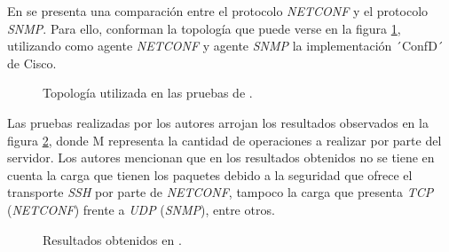 En \parencite{netconfvssnmp} se presenta una comparación entre el protocolo \textit{NETCONF} y el protocolo \textit{SNMP}. Para ello, conforman la topología que puede verse en la figura \ref{fig:netconfvssnmp1}, utilizando como agente \textit{NETCONF} y agente \textit{SNMP} la implementación ´ConfD´ de Cisco.

\begin{figure}[H]
	\centering 
	\caption[Topología utilizada en las pruebas de.]{Topología utilizada en las pruebas de \parencite{netconfvssnmp}.}
	\label{fig:netconfvssnmp1}
\end{figure}

Las pruebas realizadas por los autores arrojan los resultados observados en la figura \ref{fig:netconfvssnmp2}, donde M representa la cantidad de operaciones a realizar por parte del servidor. Los autores mencionan que en los resultados obtenidos no se tiene en cuenta la carga que tienen los paquetes debido a la seguridad que ofrece el transporte \textit{SSH} por parte de \textit{NETCONF}, tampoco la carga que presenta \textit{TCP} (\textit{NETCONF}) frente a \textit{UDP} (\textit{SNMP}), entre otros.

\begin{figure}[th]
	\centering 
	\caption[Resultados obtenidos en.]{Resultados obtenidos en \parencite{netconfvssnmp}.}
	\label{fig:netconfvssnmp2}
\end{figure}

